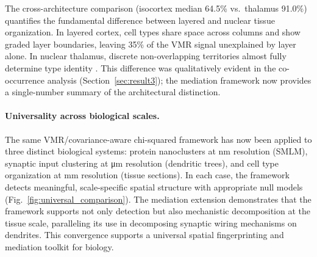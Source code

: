 \documentclass[11pt,a4paper]{article}
\begin{document}
The cross-architecture comparison (isocortex median 64.5\% vs.\ thalamus 91.0\%)
quantifies the fundamental difference between layered and nuclear tissue
organization. In layered cortex, cell types share space across columns and show
graded layer boundaries, leaving 35\% of the VMR signal unexplained by layer
alone. In nuclear thalamus, discrete non-overlapping territories almost fully
determine type identity \citep{Kapustina2024}. This difference was qualitatively
evident in the co-occurrence analysis (Section~\ref{sec:result3}); the mediation
framework now provides a single-number summary of the architectural distinction.

\paragraph{Universality across biological scales.}
The same VMR/covariance-aware chi-squared framework has now been applied to three
distinct biological systems: protein nanoclusters at nm resolution (SMLM),
synaptic input clustering at \si{\micro\meter} resolution (dendritic trees), and
cell type organization at \si{\milli\meter} resolution (tissue sections). In each
case, the framework detects meaningful, scale-specific spatial structure with
appropriate null models (Fig.~\ref{fig:universal_comparison}). The mediation
extension demonstrates that the framework supports not only detection but also
mechanistic decomposition at the tissue scale, paralleling its use in decomposing
synaptic wiring mechanisms on dendrites. This convergence supports a universal
spatial fingerprinting and mediation toolkit for biology.

\end{document}
